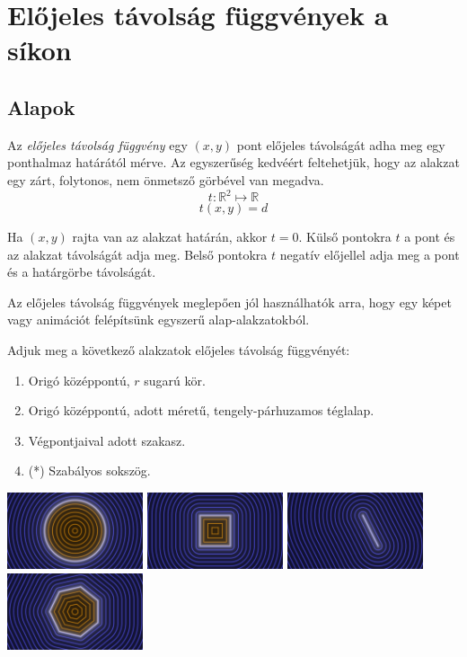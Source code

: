 \section{Előjeles távolság függvények a síkon}

\subsection{Alapok}

\begin{tcolorbox}[title=Előjeles távolság függvény (signed distance function)]
  Az \emph{előjeles távolság függvény} egy $(x,y)$ pont előjeles távolságát adha meg egy ponthalmaz határától mérve.
  Az egyszerűség kedvéért feltehetjük, hogy az alakzat egy zárt, folytonos, nem önmetsző görbével van megadva.
  $$ t: \mathbb{R}^2 \mapsto \mathbb{R}$$
  $$ t(x, y) = d$$

  Ha $(x,y)$ rajta van az alakzat határán, akkor $t = 0$. Külső pontokra $t$ a pont és az alakzat távolságát adja meg.
  Belső pontokra $t$ negatív előjellel adja meg a pont és a határgörbe távolságát.
  
  Az előjeles távolság függvények meglepően jól használhatók arra, hogy egy képet vagy animációt felépítsünk egyszerű
  alap-alakzatokból.
  \end{tcolorbox}

\matfeladatok


Adjuk meg a következő alakzatok előjeles távolság függvényét:

\begin{enumerate}
  \item Origó középpontú, $r$ sugarú kör.
  \item Origó középpontú, adott méretű, tengely-párhuzamos téglalap.
  \item Végpontjaival adott szakasz.
  \item (*) Szabályos sokszög.
\end{enumerate}

\includegraphics[width=4cm]{images/sdCircle.png}
\includegraphics[width=4cm]{images/sdSquare.png}
\includegraphics[width=4cm]{images/sdSegment.png}
\includegraphics[width=4cm]{images/sdNgon.png}


